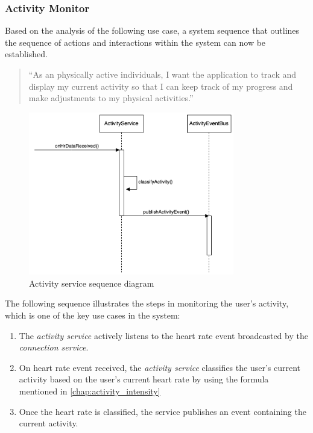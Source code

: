 \subsubsection{Activity Monitor}
Based on the analysis of the following use case, a system sequence that outlines the sequence of actions and interactions within the system can now be established.
\begin{quotation}
    \enquote{As an physically active individuals, I want the application to track and display my current activity so that I can keep track of my progress and make adjustments to my physical activities.} 
\end{quotation}

\begin{figure}[H]
    \centering
    \includegraphics[width=0.8\textwidth]{diagrams/activity-monitor-seq.drawio.png}
    \caption{Activity service sequence diagram}
    \label{fig:activity_diagram}
\end{figure}

The following sequence illustrates the steps in monitoring the user's activity, which is one of the key use cases in the system:
\begin{enumerate}
    \item The \emph{activity service} actively listens to the heart rate event broadcasted by the \emph{connection service}.
    \item On heart rate event received, the \emph{activity service} classifies the user's current activity based on the user's current heart rate by using the formula mentioned in \autoref{chap:activity_intensity}
    \item Once the heart rate is classified, the service publishes an event containing the current activity.
\end{enumerate}




